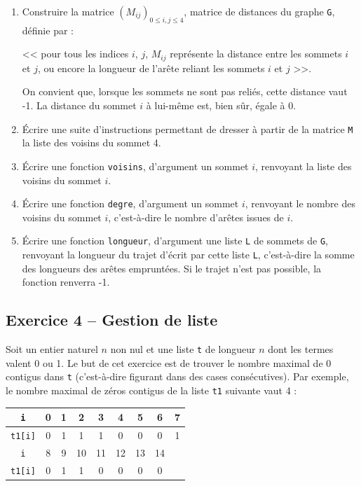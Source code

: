 \documentclass[10pt,fleqn]{article} %
\begin{document}
\begin{multicols}{2}
\begin{enumerate}
\item Construire la matrice $\left( M_{ij}\right)_{0\leq i,j\leq 4}$, matrice de distances du graphe \texttt{G}, définie par :

<< pour tous les indices $i$, $j$, $M_{ij}$ représente la distance entre les sommets $i$ et $j$,
ou encore la longueur de l’arête reliant les sommets $i$ et $j$ >>.

On convient que, lorsque les sommets ne sont pas reliés, cette distance vaut -1. La distance du
sommet $i$ à lui-même est, bien sûr, égale à 0.
\item Écrire une suite d'instructions permettant de dresser à partir de la matrice \texttt{M} la liste des voisins du sommet 4.
\item Écrire une fonction \texttt{voisins}, d’argument un sommet $i$, renvoyant la liste des voisins du sommet $i$.
\item Écrire une fonction \texttt{degre}, d’argument un sommet $i$, renvoyant le nombre des voisins du sommet $i$, c’est-à-dire le nombre d’arêtes issues de $i$.
\item Écrire une fonction \texttt{longueur}, d’argument une liste \texttt{L} de sommets de \texttt{G}, renvoyant la longueur du trajet d'écrit par cette liste \texttt{L}, c’est-à-dire la somme des longueurs des arêtes empruntées. Si le trajet n’est pas possible, la fonction renverra -1.
\end{enumerate}


\subsection*{Exercice 4 -- Gestion de liste}
Soit un entier naturel $n$ non nul et une liste \texttt{t} de longueur $n$ dont les termes valent 0 ou 1. Le but de cet exercice est de trouver le nombre maximal de 0 contigus dans \texttt{t} (c’est-à-dire figurant dans des cases consécutives). Par exemple, le nombre maximal de zéros contigus de la liste \texttt{t1} suivante vaut 4 :
\begin{center}
\begin{tabular}{|c|c|c|c|c|c|c|c|c|}
\hline 
\texttt{i} & 0 & 1 & 2 & 3 & 4 & 5 & 6 & 7 \\
\hline
\texttt{t1[i]} & 0 & 1 & 1 & 1 & 0 & 0 & 0 & 1 \\
\hline
\hline
\texttt{i} & 8 & 9 & 10 & 11 & 12 & 13 & 14 \\
\cline{0-7} 
\texttt{t1[i]} & 0 & 1 & 1 & 0 & 0 & 0 & 0 \\
\cline{0-7}  
\end{tabular}
\end{center}


\end{multicols}
\end{document}
